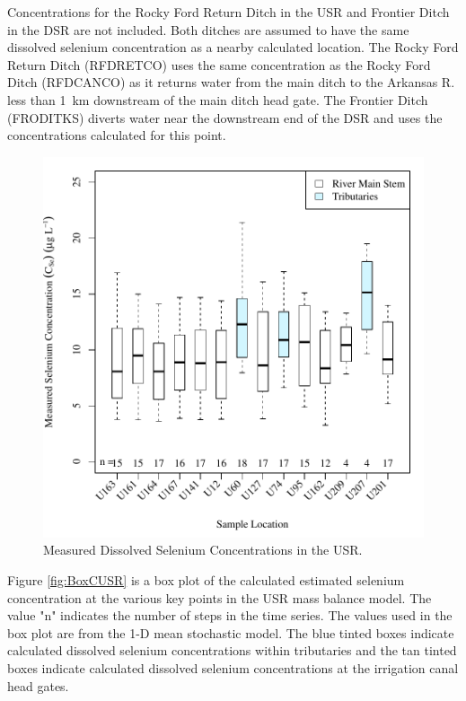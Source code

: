 \begin{linenumbers}
Concentrations for the Rocky Ford Return Ditch in the USR and Frontier Ditch in the DSR are not included.  Both ditches are assumed to have the same dissolved selenium concentration as a nearby calculated location.  The Rocky Ford Return Ditch (RFDRETCO) uses the same concentration as the Rocky Ford Ditch (RFDCANCO) as it returns water from the main ditch to the Arkansas R. less than \SI{1}{\kilo\meter} downstream of the main ditch head gate.  The Frontier Ditch (FRODITKS) diverts water near the downstream end of the DSR and uses the concentrations calculated for this point.

\begin{figure}[htbp]
\centering
	\includegraphics[width=6in]{"Figures/Results_USR/Stochastic/c BOX Measure CSe"}
	\caption[Measured Dissolved Selenium Concentrations in the USR.]{Measured Dissolved Selenium Concentrations in the USR.}
	\label{fig:BoxMUSR}
\end{figure}

Figure \ref{fig:BoxCUSR} is a box plot of the calculated estimated selenium concentration at the various key points in the USR mass balance model.  The value "n" indicates the number of steps in the time series.  The values used in the box plot are from the 1-D mean stochastic model.  The blue tinted boxes indicate calculated dissolved selenium concentrations within tributaries and the tan tinted boxes indicate calculated dissolved selenium concentrations at the irrigation canal head gates.


\end{linenumbers}
